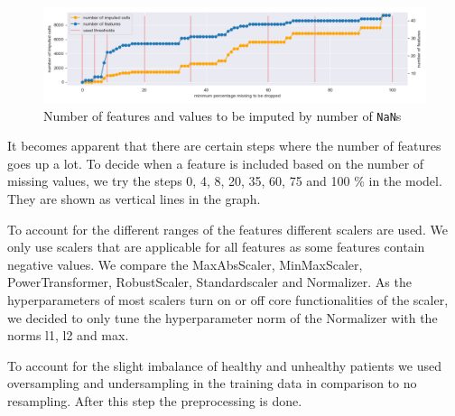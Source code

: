 \begin{figure}[h]
	\centering
	\includegraphics[width=\textwidth]{images/percentageToBeDropped.png}
	\caption{Number of features and values to be imputed by number of \texttt{NaN}s}
	\label{fig:percentageToBeDropped}
\end{figure}

It becomes apparent that there are certain steps where the number of features goes up a lot. To decide when a feature is included based on the number of missing values, we try the steps 0, 4, 8, 20, 35, 60, 75 and 100 \% in the model. They are shown as vertical lines in the graph. 

To account for the different ranges of the features different scalers are used. We only use scalers that are applicable for all features as some features contain negative values.
We compare the MaxAbsScaler, MinMaxScaler, PowerTransformer, RobustScaler, Standardscaler and Normalizer. As the hyperparameters of most scalers turn on or off core functionalities of the scaler, we decided to only tune the hyperparameter norm of the Normalizer with the norms l1, l2 and max.

To account for the slight imbalance of healthy and unhealthy patients we used oversampling and undersampling in the training data in comparison to no resampling. After this step the preprocessing is done. 


